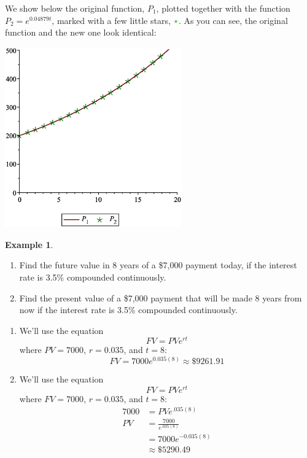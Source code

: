 \documentclass[oneside]{book}
\theoremstyle{definition}
\newtheorem{example}{Example}
\theoremstyle{solution}
\newtheorem*{solution}{Solution}
\newenvironment{solution}{\vspace{2in}\comment}{\endcomment}
\begin{document}
\begin{solution}
\begin{enumerate}
  We show below the original function, $P_1$, plotted together with
  the function $P_2 = e^{0.04879t}$, marked with a few little stars,
  $\color{green!75!black}\star$.  As you can see, the original
  function and the new one look identical:
\begin{center}
\includegraphics[width=3in]{city_population_two_models}
\end{center}
\end{enumerate}
\end{solution}

\begin{example}
\begin{enumerate}
\item Find the future value in 8 years of a \$7,000 payment today, if
  the interest rate is 3.5\% compounded continuously.

\item Find the present value of a \$7,000 payment that will be made 8
  years from now if the interest rate is 3.5\% compounded
  continuously.
\end{enumerate}
\end{example}

\begin{solution}
\begin{enumerate}
\item We'll use the equation
$$
FV = PV e^{rt}
$$
where $PV = 7000$, $r = 0.035$, and $t = 8$:
$$
 FV = 7000e^{0.035(8)} \approx \$9261.91
$$

\item 
We'll use the equation
$$
FV = PV e^{rt}
$$
where $FV = 7000$, $r = 0.035$, and $t = 8$:
\begin{align*}
 7000 &= PVe^{.035(8)} \\
 PV &= \frac{7000}{e^{.035(8)}}\\
  & = 7000e^{-0.035(8)}\\
  & \approx \$5290.49 
\end{align*}
\end{enumerate}
\end{solution}
\end{document}

